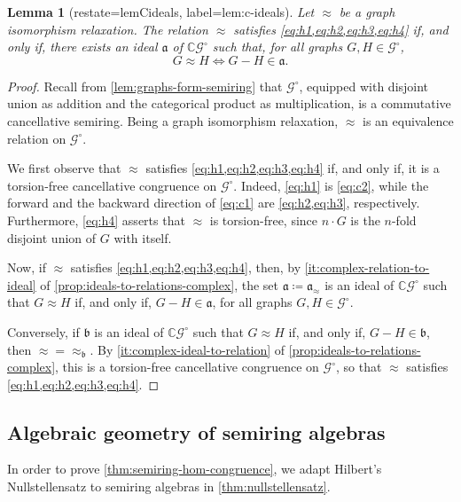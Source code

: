 \documentclass[11pt]{scrartcl}
\theoremstyle{definition}
\theoremstyle{plain}
\newtheorem{lemma}[definition]{Lemma}
\theoremstyle{remark}
\newcommand{\lG}{\mathcal{G}^\circ}
\begin{document}
	\begin{lemma}[restate=lemCideals, label=lem:c-ideals]
		Let $\approx$ be a graph isomorphism relaxation.
		The relation $\approx$ satisfies \cref{eq:h1,eq:h2,eq:h3,eq:h4} if, and only if, 
		there exists an ideal $\mathfrak{a}$ of $\mathbb{C}\lG$ such that, for all graphs $G, H \in \lG$,
		\[
			G \approx H \iff G - H \in \mathfrak{a}.
		\]
	\end{lemma}
	\begin{proof}
		Recall from \cref{lem:graphs-form-semiring} that $\lG$,
		equipped with disjoint union as addition and the categorical product as multiplication,
		is a commutative cancellative semiring.
		Being a graph isomorphism relaxation,
		$\approx$ is an equivalence relation on $\lG$.

		We first observe that $\approx$ satisfies \cref{eq:h1,eq:h2,eq:h3,eq:h4}
		if, and only if, it is a torsion-free cancellative congruence on $\lG$.
		Indeed, \cref{eq:h1} is \eqref{eq:c2},
		while the forward and the backward direction of \eqref{eq:c1}
		are \cref{eq:h2,eq:h3}, respectively.
		Furthermore, \cref{eq:h4} asserts that $\approx$ is torsion-free,
		since $n \cdot G$ is the $n$-fold disjoint union of $G$ with itself.

		Now, if $\approx$ satisfies \cref{eq:h1,eq:h2,eq:h3,eq:h4},
		then, by \cref{it:complex-relation-to-ideal} of \cref{prop:ideals-to-relations-complex},
		the set $\mathfrak{a} \coloneqq \mathfrak{a}_{\approx}$ is an ideal of $\mathbb{C}\lG$
		such that $G \approx H$ if, and only if, $G - H \in \mathfrak{a}$,
		for all graphs $G, H \in \lG$.

		Conversely, if $\mathfrak{b}$ is an ideal of $\mathbb{C}\lG$
		such that $G \approx H$ if, and only if, $G - H \in \mathfrak{b}$,
		then ${\approx} = {\approx_{\mathfrak{b}}}$.
		By \cref{it:complex-ideal-to-relation} of \cref{prop:ideals-to-relations-complex},
		this is a torsion-free cancellative congruence on $\lG$,
		so that $\approx$ satisfies \cref{eq:h1,eq:h2,eq:h3,eq:h4}.
	\end{proof}

	\subsection{Algebraic geometry of semiring algebras}
	\label{sec:alg-geo-semiring-algebra}
	
	In order to prove \cref{thm:semiring-hom-congruence}, we adapt Hilbert's Nullstellensatz to semiring algebras in \cref{thm:nullstellensatz}.
\end{document}
